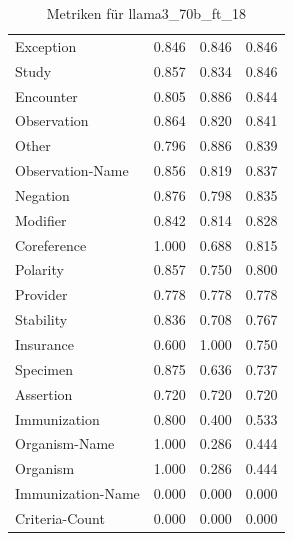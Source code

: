 \begin{table}[htbp]
\begin{tabular}{p{5cm}ccc}
Exception & 0.846 & 0.846 & 0.846 \\
Study & 0.857 & 0.834 & 0.846 \\
Encounter & 0.805 & 0.886 & 0.844 \\
Observation & 0.864 & 0.820 & 0.841 \\
Other & 0.796 & 0.886 & 0.839 \\
Observation-Name & 0.856 & 0.819 & 0.837 \\
Negation & 0.876 & 0.798 & 0.835 \\
Modifier & 0.842 & 0.814 & 0.828 \\
Coreference & 1.000 & 0.688 & 0.815 \\
Polarity & 0.857 & 0.750 & 0.800 \\
Provider & 0.778 & 0.778 & 0.778 \\
Stability & 0.836 & 0.708 & 0.767 \\
Insurance & 0.600 & 1.000 & 0.750 \\
Specimen & 0.875 & 0.636 & 0.737 \\
Assertion & 0.720 & 0.720 & 0.720 \\
Immunization & 0.800 & 0.400 & 0.533 \\
Organism-Name & 1.000 & 0.286 & 0.444 \\
Organism & 1.000 & 0.286 & 0.444 \\
Immunization-Name & 0.000 & 0.000 & 0.000 \\
Criteria-Count & 0.000 & 0.000 & 0.000 \\
\bottomrule
\end{tabular}
\caption{Metriken für llama3_70b_ft_18}
\label{tab:metrics_llama3_70b_ft_18}
\end{table}